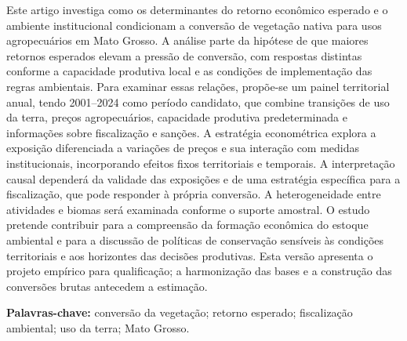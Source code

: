 Este artigo investiga como os determinantes do retorno econômico esperado e o ambiente institucional condicionam a conversão de vegetação nativa para usos agropecuários em Mato Grosso. A análise parte da hipótese de que maiores retornos esperados elevam a pressão de conversão, com respostas distintas conforme a capacidade produtiva local e as condições de implementação das regras ambientais. Para examinar essas relações, propõe-se um painel territorial anual, tendo 2001--2024 como período candidato, que combine transições de uso da terra, preços agropecuários, capacidade produtiva predeterminada e informações sobre fiscalização e sanções. A estratégia econométrica explora a exposição diferenciada a variações de preços e sua interação com medidas institucionais, incorporando efeitos fixos territoriais e temporais. A interpretação causal dependerá da validade das exposições e de uma estratégia específica para a fiscalização, que pode responder à própria conversão. A heterogeneidade entre atividades e biomas será examinada conforme o suporte amostral. O estudo pretende contribuir para a compreensão da formação econômica do estoque ambiental e para a discussão de políticas de conservação sensíveis às condições territoriais e aos horizontes das decisões produtivas. Esta versão apresenta o projeto empírico para qualificação; a harmonização das bases e a construção das conversões brutas antecedem a estimação.

\medskip
\noindent\textbf{Palavras-chave:} conversão da vegetação; retorno esperado; fiscalização ambiental; uso da terra; Mato Grosso.

